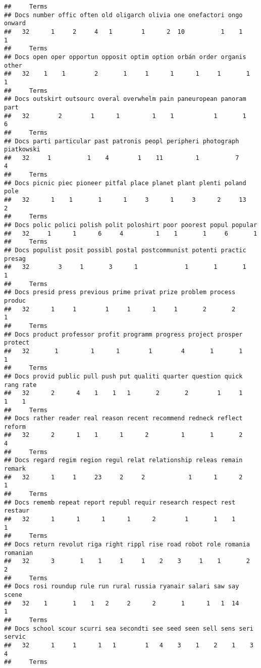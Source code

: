 \documentclass[]{article}
\begin{document}
\begin{verbatim}
##     Terms
## Docs number offic often old oligarch olivia one onefactori ongo onward
##   32      1     2     4   1        1      2  10          1    1      1
##     Terms
## Docs open oper opportun opposit optim option orbán order organis other
##   32    1    1        2       1     1      1      1     1       1     1
##     Terms
## Docs outskirt outsourc overal overwhelm pain paneuropean panoram part
##   32        2        1      1         1    1           1       1    6
##     Terms
## Docs parti particular past patronis peopl peripheri photograph piatkowski
##   32     1          1    4        1    11         1          7          4
##     Terms
## Docs picnic piec pioneer pitfal place planet plant plenti poland pole
##   32      1    1       1      1     3      1     3      2     13    2
##     Terms
## Docs polic polici polish polit poloshirt poor poorest popul popular
##   32     1      1      6     4         1    1       1     6       1
##     Terms
## Docs populist posit possibl postal postcommunist potenti practic presag
##   32        3     1       3      1             1       1       1      1
##     Terms
## Docs presid press previous prime privat prize problem process produc
##   32      1     1        1     1      1     1       2       2      1
##     Terms
## Docs product professor profit programm progress project prosper protect
##   32       1         1      1        1        4       1       1       1
##     Terms
## Docs provid public pull push put qualiti quarter question quick rang rate
##   32      2      4    1    1   1       2       2        1     1    1    1
##     Terms
## Docs rather reader real reason recent recommend redneck reflect reform
##   32      2      1    1      1      2         1       1       2      4
##     Terms
## Docs regard regim region regul relat relationship releas remain remark
##   32      1     1     23     2     2            1      1      2      1
##     Terms
## Docs rememb repeat report republ requir research respect rest restaur
##   32      1      1      1      1      2        1       1    1       1
##     Terms
## Docs return revolut riga right rippl rise road robot role romania romanian
##   32      3       1    1     1     1    2    3     1    1       2        2
##     Terms
## Docs rosi roundup rule run rural russia ryanair salari saw say scene
##   32    1       1    1   2     2      2       1      1   1  14     1
##     Terms
## Docs school scour scurri sea secondti see seed seen sell sens seri servic
##   32      1     1      1   1        1   4    3    1    2    1    3      4
##     Terms

\end{verbatim}
\end{document}
